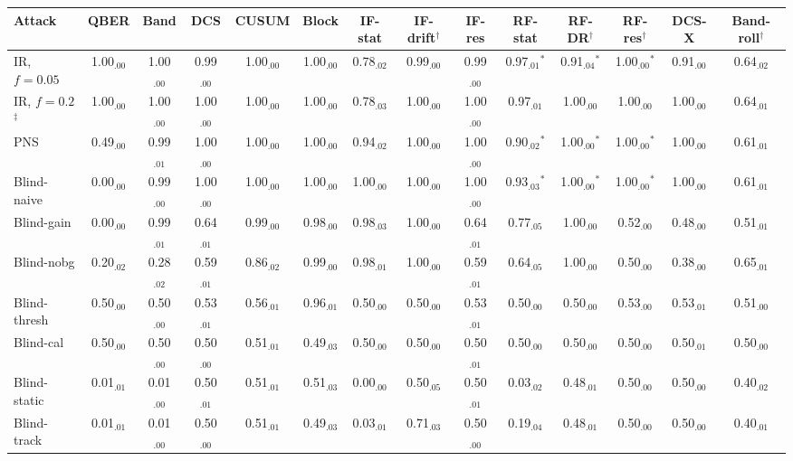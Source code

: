 \begin{tabular}{lccccccccccccc}
\hline
Attack & QBER & Band & DCS & CUSUM & Block & IF-stat & IF-drift$^\dagger$ & IF-res & RF-stat & RF-DR$^\dagger$ & RF-res$^\dagger$ & DCS-X & Band-roll$^\dagger$\\
\hline
IR, $f=0.05$ & 1.00$_{.00}$ & 1.00$_{.00}$ & 0.99$_{.00}$ & 1.00$_{.00}$ & 1.00$_{.00}$ & 0.78$_{.02}$ & 0.99$_{.00}$ & 0.99$_{.00}$ & 0.97$_{.01}$$^*$ & 0.91$_{.04}$$^*$ & 1.00$_{.00}$$^*$ & 0.91$_{.00}$ & 0.64$_{.02}$\\
IR, $f=0.2$$^\ddagger$ & 1.00$_{.00}$ & 1.00$_{.00}$ & 1.00$_{.00}$ & 1.00$_{.00}$ & 1.00$_{.00}$ & 0.78$_{.03}$ & 1.00$_{.00}$ & 1.00$_{.00}$ & 0.97$_{.01}$ & 1.00$_{.00}$ & 1.00$_{.00}$ & 1.00$_{.00}$ & 0.64$_{.01}$\\
PNS & 0.49$_{.00}$ & 0.99$_{.01}$ & 1.00$_{.00}$ & 1.00$_{.00}$ & 1.00$_{.00}$ & 0.94$_{.02}$ & 1.00$_{.00}$ & 1.00$_{.00}$ & 0.90$_{.02}$$^*$ & 1.00$_{.00}$$^*$ & 1.00$_{.00}$$^*$ & 1.00$_{.00}$ & 0.61$_{.01}$\\
Blind-naive & 0.00$_{.00}$ & 0.99$_{.00}$ & 1.00$_{.00}$ & 1.00$_{.00}$ & 1.00$_{.00}$ & 1.00$_{.00}$ & 1.00$_{.00}$ & 1.00$_{.00}$ & 0.93$_{.03}$$^*$ & 1.00$_{.00}$$^*$ & 1.00$_{.00}$$^*$ & 1.00$_{.00}$ & 0.61$_{.01}$\\
Blind-gain & 0.00$_{.00}$ & 0.99$_{.01}$ & 0.64$_{.01}$ & 0.99$_{.00}$ & 0.98$_{.00}$ & 0.98$_{.03}$ & 1.00$_{.00}$ & 0.64$_{.01}$ & 0.77$_{.05}$ & 1.00$_{.00}$ & 0.52$_{.00}$ & 0.48$_{.00}$ & 0.51$_{.01}$\\
Blind-nobg & 0.20$_{.02}$ & 0.28$_{.02}$ & 0.59$_{.01}$ & 0.86$_{.02}$ & 0.99$_{.00}$ & 0.98$_{.01}$ & 1.00$_{.00}$ & 0.59$_{.01}$ & 0.64$_{.05}$ & 1.00$_{.00}$ & 0.50$_{.00}$ & 0.38$_{.00}$ & 0.65$_{.01}$\\
Blind-thresh & 0.50$_{.00}$ & 0.50$_{.00}$ & 0.53$_{.01}$ & 0.56$_{.01}$ & 0.96$_{.01}$ & 0.50$_{.00}$ & 0.50$_{.00}$ & 0.53$_{.01}$ & 0.50$_{.00}$ & 0.50$_{.00}$ & 0.53$_{.00}$ & 0.53$_{.01}$ & 0.51$_{.00}$\\
Blind-cal & 0.50$_{.00}$ & 0.50$_{.00}$ & 0.50$_{.00}$ & 0.51$_{.01}$ & 0.49$_{.03}$ & 0.50$_{.00}$ & 0.50$_{.00}$ & 0.50$_{.01}$ & 0.50$_{.00}$ & 0.50$_{.00}$ & 0.50$_{.00}$ & 0.50$_{.01}$ & 0.50$_{.00}$\\
Blind-static & 0.01$_{.01}$ & 0.01$_{.00}$ & 0.50$_{.01}$ & 0.51$_{.01}$ & 0.51$_{.03}$ & 0.00$_{.00}$ & 0.50$_{.05}$ & 0.50$_{.01}$ & 0.03$_{.02}$ & 0.48$_{.01}$ & 0.50$_{.00}$ & 0.50$_{.00}$ & 0.40$_{.02}$\\
Blind-track & 0.01$_{.01}$ & 0.01$_{.00}$ & 0.50$_{.00}$ & 0.51$_{.01}$ & 0.49$_{.03}$ & 0.03$_{.01}$ & 0.71$_{.03}$ & 0.50$_{.00}$ & 0.19$_{.04}$ & 0.48$_{.01}$ & 0.50$_{.00}$ & 0.50$_{.00}$ & 0.40$_{.01}$\\

\end{tabular}

